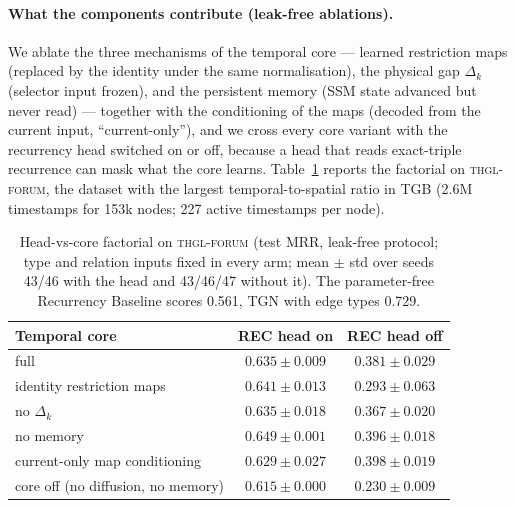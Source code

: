 \paragraph{What the components contribute (leak-free ablations).}
We ablate the three mechanisms of the temporal core --- learned restriction
maps (replaced by the identity under the same normalisation), the physical
gap $\Delta_k$ (selector input frozen), and the persistent memory (SSM state
advanced but never read) --- together with the conditioning of the maps
(decoded from the current input, ``current-only''), and we cross every
core variant with the recurrency head switched on or off, because a head
that reads exact-triple recurrence can mask what the core learns.
Table~\ref{tab:factorial} reports the factorial on \textsc{thgl-forum}, the
dataset with the largest temporal-to-spatial ratio in TGB (2.6M
timestamps for 153k nodes; 227 active timestamps per node).

\begin{table}[h]
\centering\small
\caption{Head-vs-core factorial on \textsc{thgl-forum} (test MRR, leak-free
protocol; type and relation inputs fixed in every arm; mean $\pm$ std over
seeds 43/46 with the head and 43/46/47 without it). The parameter-free
Recurrency Baseline scores 0.561, TGN with edge types 0.729.}
\label{tab:factorial}
\begin{tabular}{lcc}
\toprule
Temporal core & REC head on & REC head off \\
\midrule
full & $0.635 \pm 0.009$ & $0.381 \pm 0.029$ \\
identity restriction maps & $0.641 \pm 0.013$ & $0.293 \pm 0.063$ \\
no $\Delta_k$ & $0.635 \pm 0.018$ & $0.367 \pm 0.020$ \\
no memory & $0.649 \pm 0.001$ & $0.396 \pm 0.018$ \\
current-only map conditioning & $0.629 \pm 0.027$ & $0.398 \pm 0.019$ \\
core off (no diffusion, no memory) & $0.615 \pm 0.000$ & $0.230 \pm 0.009$ \\
\bottomrule
\end{tabular}
\end{table}

